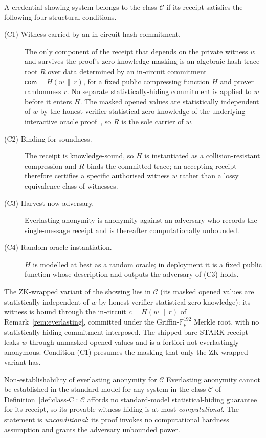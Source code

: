 \begin{definition}\label{def:class-C}
    A credential-showing system belongs to the class $\mathcal C$ if its receipt
    satisfies the following four structural conditions.
    \begin{description}
      \item[(C1) Witness carried by an in-circuit hash commitment.] The only component of the receipt that depends on the private witness $w$ and survives the proof's zero-knowledge masking is an algebraic-hash trace root $R$ over data determined by an in-circuit commitment $\mathsf{com}=H(w\,\|\,r)$, for a fixed public compressing function $H$ and prover randomness $r$. No separate statistically-hiding commitment is applied to $w$ before it enters $H$. The masked opened values are statistically independent of $w$ by the honest-verifier statistical zero-knowledge of the underlying interactive oracle proof~\cite{cryptoeprint:2024/1037}, so $R$ is the sole carrier of $w$.
      \item[(C2) Binding for soundness.] The receipt is knowledge-sound, so $H$ is instantiated as a collision-resistant compression and $R$ binds the committed trace; an accepting receipt therefore certifies a specific authorised witness $w$ rather than a lossy equivalence class of witnesses.
      \item[(C3) Harvest-now adversary.] Everlasting anonymity is anonymity against an adversary who records the single-message receipt and is thereafter computationally unbounded.
      \item[(C4) Random-oracle instantiation.] $H$ is modelled at best as a random oracle; in deployment it is a fixed public function whose description and outputs the adversary of (C3) holds.
    \end{description}
    The ZK-wrapped variant of the showing lies in $\mathcal C$ (its masked opened values are statistically independent of $w$ by honest-verifier statistical zero-knowledge): its witness is bound through the in-circuit $c=H(w\,\|\,r)$ of Remark~\ref{rem:everlasting}, committed under the Griffin-$\mathbb F_p^{192}$ Merkle root, with no statistically-hiding commitment interposed. The shipped bare STARK receipt leaks $w$ through unmasked opened values and is a fortiori not everlastingly anonymous. Condition (C1) presumes the masking that only the ZK-wrapped variant has.
\end{definition}

\begin{impossibilitybox}{Non-establishability of everlasting anonymity for $\mathcal C$}\label{thm:no-everlasting}
    Everlasting anonymity cannot be established in the standard model for any system in the class $\mathcal C$ of Definition~\ref{def:class-C}: $\mathcal C$ affords no standard-model statistical-hiding guarantee for its receipt, so its provable witness-hiding is at most \emph{computational}. The statement is \emph{unconditional}: its proof invokes no computational hardness assumption and grants the adversary unbounded power.
\end{impossibilitybox}

